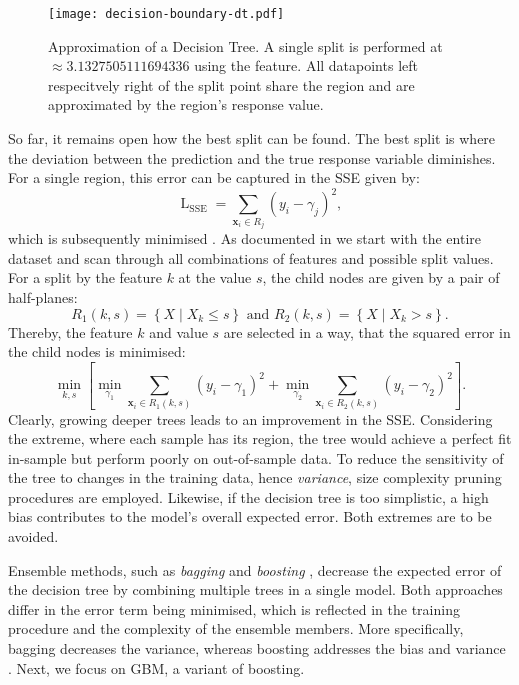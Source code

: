 \begin{figure}[h]
    \centering
    \texttt{[image: decision-boundary-dt.pdf]}
    \caption[Approximation of Decision Tree]{Approximation of a Decision Tree. A single split is performed at $\approx\num{3.1327505111694336}$ using the feature. All datapoints left respecitvely right of the split point share the region and are approximated by the region's response value.}
    \label{fig:decision-boundary-dt}
\end{figure}

So far, it remains open how the best split can be found. The best split is where the deviation between the prediction and the true response variable diminishes. For a single region, this error can be captured in the \gls{SSE} given by:
\begin{equation}
    \operatorname{L}_{\mathrm{SSE}} =\sum_{\mathbf{x}_{i} \in R_j}\left(y_{i}-\gamma_{j}\right)^{2},
\end{equation}
which is subsequently minimised \autocite[][231]{breimanClassificationRegressionTrees2017}. As documented in \textcite[][326]{hastietrevorElementsStatisticalLearning2009} we start with the entire dataset and scan through all combinations of features and possible split values. For a split by the feature $k$ at the value $s$, the child nodes are given by a pair of half-planes:
\begin{equation}
    R_1(k, s)=\left\{X \mid X_k \leq s\right\} \text { and } R_2(k, s)=\left\{X \mid X_k>s\right\}.
\end{equation}
Thereby, the feature $k$ and value $s$ are selected in a way, that the squared error in the child nodes is minimised:
\begin{equation}
    \min _{k, s}\left[\min _{\gamma_1} \sum_{\mathbf{x}_i \in R_1(k, s)}\left(y_i-\gamma_1\right)^2+\min _{\gamma_2} \sum_{\mathbf{x}_i \in R_2(k, s)}\left(y_i-\gamma_2\right)^2\right].
\end{equation}
Clearly, growing deeper trees leads to an improvement in the \gls{SSE}. Considering the extreme, where each sample has its region, the tree would achieve a perfect fit in-sample but perform poorly on out-of-sample data. To reduce the sensitivity of the tree to changes in the training data, hence \emph{variance}, size complexity pruning procedures are employed. Likewise, if the decision tree is too simplistic, a high bias contributes to the model's overall expected error. Both extremes are to be avoided.

Ensemble methods, such as \emph{bagging} \autocite[][123]{breimanBaggingPredictors1996} and \emph{boosting} \autocite[][197--227]{schapireStrengthWeakLearnability1990}, decrease the expected error of the decision tree by combining multiple trees in a single model. Both approaches differ in the error term being minimised, which is reflected in the training procedure and the complexity of the ensemble members. More specifically, bagging decreases the variance, whereas boosting addresses the bias and variance \autocites[][1672]{schapireBoostingMarginNew1998}[][29]{breimanRandomForests2001}. Next, we focus on \gls{GBM}, a variant of boosting.

